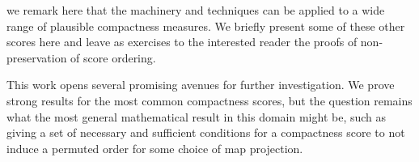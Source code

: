 we remark here that the machinery and techniques can be applied to a wide range of plausible compactness measures.  We briefly present some of these other scores here and leave as exercises to the interested reader the proofs of non-preservation of score ordering.


This work opens several promising avenues for further investigation.  We prove strong results for the most common compactness scores, but the question remains what the most general mathematical result in this domain might be, such as giving a set of necessary and sufficient conditions for a compactness score to not induce a permuted order for some choice of map projection.  